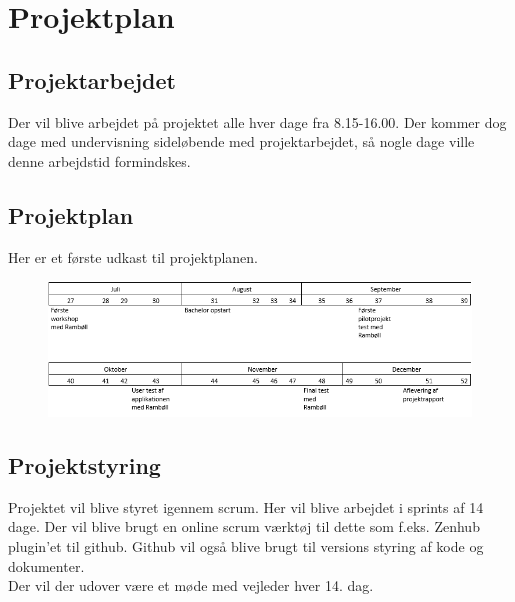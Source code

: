 
	\chapter{Projektplan}
	
	\section{Projektarbejdet}
	Der vil blive arbejdet på projektet alle hver dage fra 8.15-16.00. Der kommer dog dage med undervisning sideløbende med projektarbejdet, så nogle dage ville denne arbejdstid formindskes. \\
	
	\section{Projektplan}
	Her er et første udkast til projektplanen.
	\begin{figure}[h!]
		\centering
		\includegraphics[width=1\linewidth]{Projektplan/Projektplan}
	\end{figure}

	\section{Projektstyring}
	Projektet vil blive styret igennem scrum. Her vil blive arbejdet i sprints af 14 dage. Der vil blive brugt en online scrum værktøj til dette som f.eks. Zenhub plugin'et til github. Github vil også blive brugt til versions styring af kode og dokumenter. \\
	Der vil der udover være et møde med vejleder hver 14. dag. \\
	
